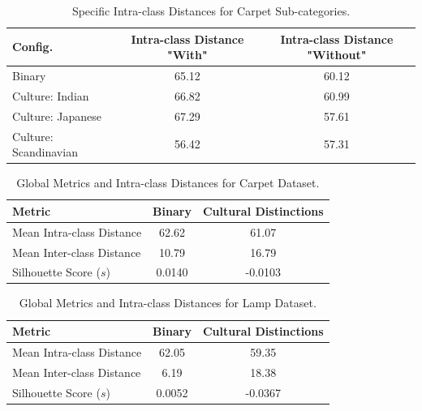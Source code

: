 %
\begin{table}[ht]
\centering
\caption{Specific Intra-class Distances for Carpet Sub-categories.}
\label{ch2:tab:carpet_intra}
\begin{tabular}{@{}lcc@{}}
\toprule
\textbf{Config.} & \textbf{Intra-class Distance} "With" &  \textbf{Intra-class Distance} "Without" \\
 \midrule
Binary & 65.12 &  60.12 \\ 
\midrule
 Culture: Indian & 66.82 & 60.99 \\
 Culture: Japanese & 67.29 & 57.61 \\
 Culture: Scandinavian & 56.42 & 57.31 \\ 
\bottomrule
\end{tabular}
\end{table}
%
%
\begin{table}[ht]
    \centering
    \caption{Global Metrics and Intra-class Distances for Carpet Dataset.}
    \label{ch2:tab:carpet_results}
    \begin{tabular}{@{}lcc@{}}
    \toprule
    \textbf{Metric} & \textbf{Binary} & \textbf{Cultural Distinctions} \\ 
    \midrule
    Mean Intra-class Distance & 62.62 & 61.07 \\
    Mean Inter-class Distance & 10.79 & 16.79 \\
    Silhouette Score ($s$) & 0.0140 & -0.0103 \\ 
    \bottomrule
    \end{tabular}
\end{table}

\begin{table}[ht]
\centering
\caption{Global Metrics and Intra-class Distances for Lamp Dataset.}
\label{ch2:tab:lamp_results}
\begin{tabular}{@{}lcc@{}}
\toprule
\textbf{Metric} & \textbf{Binary} & \textbf{Cultural Distinctions} \\
\midrule
Mean Intra-class Distance & 62.05 & 59.35 \\
Mean Inter-class Distance & 6.19 & 18.38 \\
Silhouette Score ($s$) & 0.0052 & -0.0367 \\ 
\bottomrule
\end{tabular}
\end{table}

